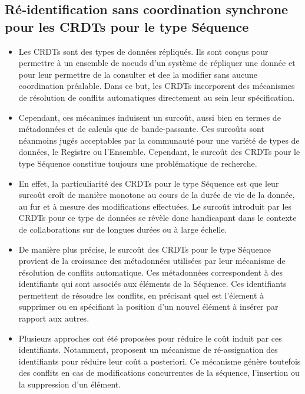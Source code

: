 \subsection{Ré-identification sans coordination synchrone pour les \acp{CRDT} pour le type Séquence}
\label{sec:research-questions-rls}
\begin{itemize}
    \item Les \acfp{CRDT} \cite{2007-crdt-shapiro,shapiro_2011_crdt} sont des types de données répliqués.
        Ils sont conçus pour permettre à un ensemble de noeuds d'un système de répliquer une donnée et pour leur permettre de la consulter et dee la modifier sans aucune coordination préalable.
        Dans ce but, les \acp{CRDT} incorporent des mécanismes de résolution de conflits automatiques directement au sein leur spécification.
    \item Cependant, ces mécanimes induisent un surcoût, aussi bien en termes de métadonnées et de calculs que de bande-passante.
        Ces surcoûts sont néanmoins jugés acceptables par la communauté pour une variété de types de données, \eg le Registre ou l'Ensemble.
        Cependant, le surcoût des \acp{CRDT} pour le type Séquence constitue toujours une problématique de recherche.
    \item En effet, la particuliarité des \acp{CRDT} pour le type Séquence est que leur surcoût croît de manière monotone au cours de la durée de vie de la donnée, \ie au fur et à mesure des modifications effectuées.
        Le surcoût introduit par les \acp{CRDT} pour ce type de données se révèle donc handicapant dans le contexte de collaborations sur de longues durées ou à large échelle.
    \item De manière plus précise, le surcoût des \acp{CRDT} pour le type Séquence provient de la croissance des métadonnées utilisées par leur mécanisme de résolution de conflits automatique.
        Ces métadonnées correspondent à des identifiants qui sont associés aux éléments de la Séquence.
        Ces identifiants permettent de résoudre les conflits, \eg en précisant quel est l'élement à supprimer ou en spécifiant la position d'un nouvel élément à insérer par rapport aux autres.
    \item Plusieurs approches ont été proposées pour réduire le coût induit par ces identifiants.
        Notamment, \cite{letia:hal-01248270,zawirski:hal-01248197} proposent un mécanisme de ré-assignation des identifiants pour réduire leur coût a posteriori.
        Ce mécanisme génère toutefois des conflits en cas de modifications concurrentes de la séquence, \ie l'insertion ou la suppression d'un élément.

\end{itemize}
